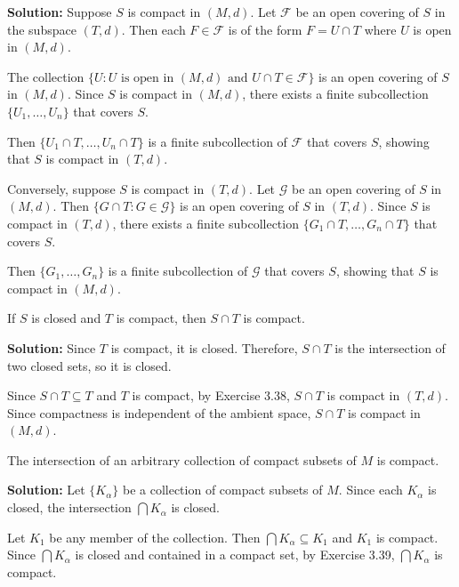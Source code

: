 \textbf{Solution:} Suppose $S$ is compact in $(M,d)$. Let $\mathcal{F}$ be an open covering of $S$ in the subspace $(T,d)$. Then each $F \in \mathcal{F}$ is of the form $F = U \cap T$ where $U$ is open in $(M,d)$.

The collection $\{U : U \text{ is open in } (M,d) \text{ and } U \cap T \in \mathcal{F}\}$ is an open covering of $S$ in $(M,d)$. Since $S$ is compact in $(M,d)$, there exists a finite subcollection $\{U_1, \ldots, U_n\}$ that covers $S$.

Then $\{U_1 \cap T, \ldots, U_n \cap T\}$ is a finite subcollection of $\mathcal{F}$ that covers $S$, showing that $S$ is compact in $(T,d)$.

Conversely, suppose $S$ is compact in $(T,d)$. Let $\mathcal{G}$ be an open covering of $S$ in $(M,d)$. Then $\{G \cap T : G \in \mathcal{G}\}$ is an open covering of $S$ in $(T,d)$. Since $S$ is compact in $(T,d)$, there exists a finite subcollection $\{G_1 \cap T, \ldots, G_n \cap T\}$ that covers $S$.

Then $\{G_1, \ldots, G_n\}$ is a finite subcollection of $\mathcal{G}$ that covers $S$, showing that $S$ is compact in $(M,d)$.

\begin{problembox}
If \( S \) is closed and \( T \) is compact, then \( S \cap T \) is compact.
\end{problembox}

\textbf{Solution:} Since $T$ is compact, it is closed. Therefore, $S \cap T$ is the intersection of two closed sets, so it is closed.

Since $S \cap T \subseteq T$ and $T$ is compact, by Exercise 3.38, $S \cap T$ is compact in $(T,d)$. Since compactness is independent of the ambient space, $S \cap T$ is compact in $(M,d)$.

\begin{problembox}
The intersection of an arbitrary collection of compact subsets of \( M \) is compact.
\end{problembox}

\textbf{Solution:} Let $\{K_\alpha\}$ be a collection of compact subsets of $M$. Since each $K_\alpha$ is closed, the intersection $\bigcap K_\alpha$ is closed.

Let $K_1$ be any member of the collection. Then $\bigcap K_\alpha \subseteq K_1$ and $K_1$ is compact. Since $\bigcap K_\alpha$ is closed and contained in a compact set, by Exercise 3.39, $\bigcap K_\alpha$ is compact.

